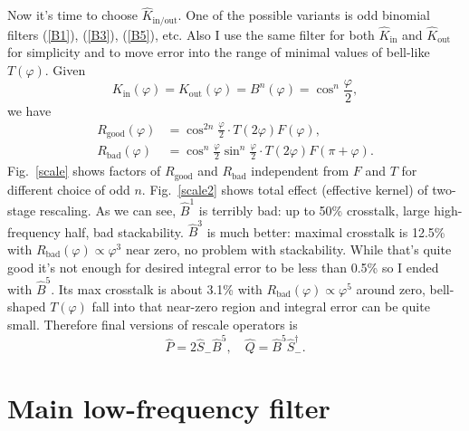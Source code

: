 \documentclass[10pt]{article}
\begin{document}
Now it's time to choose $\hat K_{\text{in/out}}$. One of the possible variants is odd binomial
filters (\ref{B1}), (\ref{B3}), (\ref{B5}), etc. Also I use the same filter for both $\hat
K_{\text{in}}$ and $\hat K_{\text{out}}$ for simplicity and to move error into the range of minimal
values of bell-like $T(\varphi)$. Given
\begin{equation}
    K_{\text{in}}(\varphi) = K_{\text{out}}(\varphi) = B^n(\varphi) = \cos^n\frac\varphi2,
\end{equation}
we have
\begin{align}
    R_{\text{good}}(\varphi) &= \cos^{2n}\frac\varphi2 \cdot T(2\varphi)F(\varphi),\\
    R_{\text{bad}}(\varphi) &= \cos^n\frac\varphi2\sin^n\frac\varphi2 \cdot T(2\varphi)F(\pi+\varphi).
\end{align}
Fig.~\ref{scale} shows factors of $R_{\text{good}}$ and $R_{\text{bad}}$ independent from $F$ and
$T$ for different choice of odd $n$. Fig.~\ref{scale2} shows total effect (effective kernel) of
two-stage rescaling. As we can see, $\hat B^1$ is terribly bad: up to 50\% crosstalk, large
high-frequency half, bad stackability. $\hat B^3$ is much better: maximal crosstalk is 12.5\% with
$R_{\text{bad}}(\varphi) \propto \varphi^3$ near zero, no problem with stackability. While that's
quite good it's not enough for desired integral error to be less than 0.5\% so I ended with $\hat
B^5$. Its max crosstalk is about 3.1\% with $R_{\text{bad}}(\varphi) \propto \varphi^5$ around zero,
bell-shaped $T(\varphi)$ fall into that near-zero region and integral error can be quite small.
Therefore final versions of rescale operators is
\begin{equation}
    \hat P = 2\hat S_-\hat B^5,\quad
    \hat Q = \hat B^5\hat S^\dagger_-.
\end{equation}


\section{Main low-frequency filter}
\end{document}
